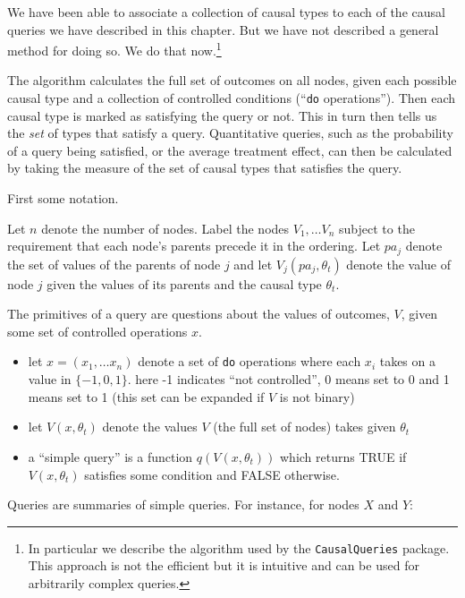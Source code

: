 \documentclass[
  12pt,
]{book}
\providecommand{\tightlist}{%
  \setlength{\itemsep}{0pt}\setlength{\parskip}{0pt}}
\begin{document}
We have been able to associate a collection of causal types to each of the causal queries we have described in this chapter. But we have not described a general method for doing so. We do that now.\footnote{In particular we describe the algorithm used by the \texttt{CausalQueries} package. This approach is not the efficient but it is intuitive and can be used for arbitrarily complex queries.}

The algorithm calculates the full set of outcomes on all nodes, given each possible causal type and a collection of controlled conditions (``\texttt{do} operations''). Then each causal type is marked as satisfying the query or not. This in turn then tells us the \emph{set} of types that satisfy a query. Quantitative queries, such as the probability of a query being satisfied, or the average treatment effect, can then be calculated by taking the measure of the set of causal types that satisfies the query.

First some notation.

Let \(n\) denote the number of nodes. Label the nodes \(V_1, \dots V_n\) subject to the requirement that each node's parents precede it in the ordering. Let \(pa_j\) denote the set of values of the parents of node \(j\) and let \(V_j(pa_j, \theta_t)\) denote the value of node \(j\) given the values of its parents and the causal type \(\theta_t\).

The primitives of a query are questions about the values of outcomes, \(V\), given some set of controlled operations \(x\).

\begin{itemize}
\tightlist
\item
  let \(x = (x_1, \dots x_n)\) denote a set of \texttt{do} operations where each \(x_i\) takes on a value in \(\{-1,0,1\}\). here -1 indicates ``not controlled'', 0 means set to 0 and 1 means set to 1 (this set can be expanded if \(V\) is not binary)
\item
  let \(V(x, \theta_t)\) denote the values \(V\) (the full set of nodes) takes given \(\theta_t\)
\item
  a ``simple query'' is a function \(q(V(x, \theta_t))\) which returns TRUE if \(V(x, \theta_t)\) satisfies some condition and FALSE otherwise.
\end{itemize}

Queries are summaries of simple queries. For instance, for nodes \(X\) and \(Y\):
\end{document}
